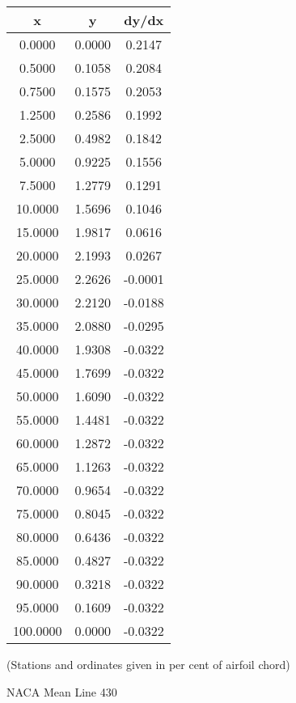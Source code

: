 \documentclass[11pt]{book}
\begin{document}
 \vspace{8mm}
 \begin{tabular}{|c|c|c|}  \hline
 x & y & dy/dx \\
 \hline
0.0000 & 0.0000 & 0.2147 \\
0.5000 & 0.1058 & 0.2084 \\
0.7500 & 0.1575 & 0.2053 \\
1.2500 & 0.2586 & 0.1992 \\
2.5000 & 0.4982 & 0.1842 \\
5.0000 & 0.9225 & 0.1556 \\
7.5000 & 1.2779 & 0.1291 \\
10.0000 & 1.5696 & 0.1046 \\
15.0000 & 1.9817 & 0.0616 \\
20.0000 & 2.1993 & 0.0267 \\
25.0000 & 2.2626 & -0.0001 \\
30.0000 & 2.2120 & -0.0188 \\
35.0000 & 2.0880 & -0.0295 \\
40.0000 & 1.9308 & -0.0322 \\
45.0000 & 1.7699 & -0.0322 \\
50.0000 & 1.6090 & -0.0322 \\
55.0000 & 1.4481 & -0.0322 \\
60.0000 & 1.2872 & -0.0322 \\
65.0000 & 1.1263 & -0.0322 \\
70.0000 & 0.9654 & -0.0322 \\
75.0000 & 0.8045 & -0.0322 \\
80.0000 & 0.6436 & -0.0322 \\
85.0000 & 0.4827 & -0.0322 \\
90.0000 & 0.3218 & -0.0322 \\
95.0000 & 0.1609 & -0.0322 \\
100.0000 & 0.0000 & -0.0322 \\
 \hline
 \end{tabular}
 \vspace{8mm}

(Stations and ordinates given in per cent of airfoil chord)

 \newpage
 \label{ml430}
 \begin{Large}
 NACA Mean Line 430
 \end{Large}
  
\end{document}
